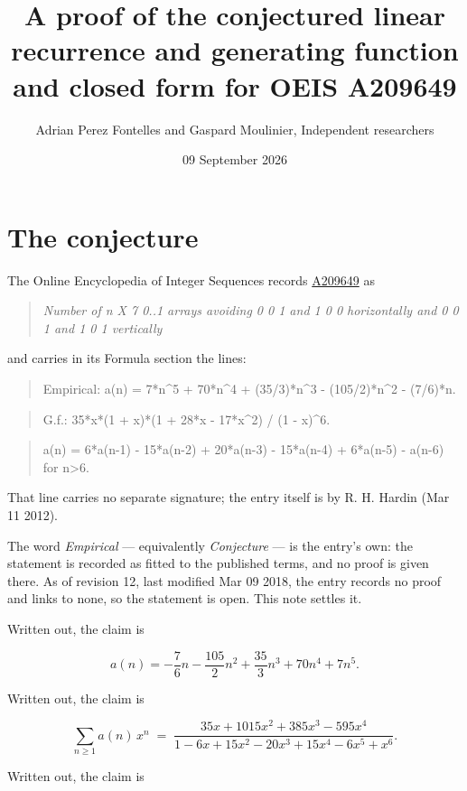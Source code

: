 \documentclass[11pt]{article}
\title{A proof of the conjectured linear recurrence and generating function and closed form for OEIS A209649}
\author{Adrian Perez Fontelles and Gaspard Moulinier, Independent researchers}
\date{09 September 2026}
\theoremstyle{definition}
\begin{document}
\maketitle
\section{The conjecture}

The Online Encyclopedia of Integer Sequences records \href{https://oeis.org/A209649}{A209649} as

\begin{quote}\itshape Number of n X 7 0..1 arrays avoiding 0 0 1 and 1 0 0 horizontally and 0 0 1 and 1 0 1 vertically\end{quote}

and carries in its Formula section the lines:

\begin{quote}\ttfamily Empirical: a(n) = 7*n\textasciicircum{}5 + 70*n\textasciicircum{}4 + (35/3)*n\textasciicircum{}3 - (105/2)*n\textasciicircum{}2 - (7/6)*n.\end{quote}

\begin{quote}\ttfamily G.f.: 35*x*(1 + x)*(1 + 28*x - 17*x\textasciicircum{}2) / (1 - x)\textasciicircum{}6.\end{quote}

\begin{quote}\ttfamily a(n) = 6*a(n-1) - 15*a(n-2) + 20*a(n-3) - 15*a(n-4) + 6*a(n-5) - a(n-6) for n>6.\end{quote}

That line carries no separate signature; the entry itself is by R. H. Hardin (Mar 11 2012).

The word {\itshape Empirical} --- equivalently {\itshape Conjecture} --- is the entry's own: the statement is recorded as fitted to the published terms, and no proof is given there. As of revision 12, last modified Mar 09 2018, the entry records no proof and links to none, so the statement is open. This note settles it.

Written out, the claim is

\[a(n) = -\frac{7}{6}n - \frac{105}{2}n^{2} + \frac{35}{3}n^{3} + 70n^{4} + 7n^{5}.\]

Written out, the claim is

\[\sum_{n \ge 1} a(n)\,x^n \;=\; \frac{35x + 1015x^{2} + 385x^{3} - 595x^{4}}{1 - 6x + 15x^{2} - 20x^{3} + 15x^{4} - 6x^{5} + x^{6}}.\]

Written out, the claim is
\end{document}
